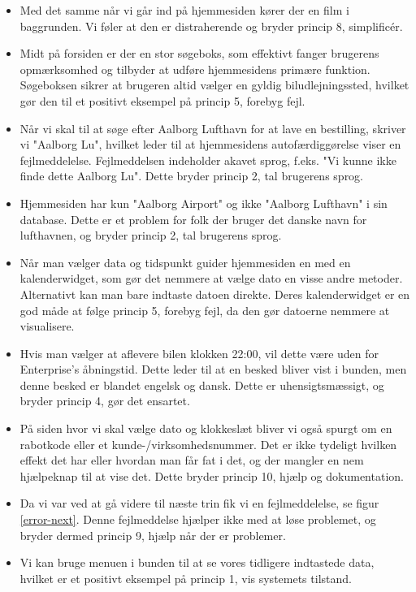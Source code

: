 \documentclass[a4paper]{article}
\begin{document}
\begin{itemize}
\item Med det samme når vi går ind på hjemmesiden kører der en film i baggrunden. Vi føler at den er distraherende og bryder princip 8, simplificér.
\item Midt på forsiden er der en stor søgeboks, som effektivt fanger brugerens opmærksomhed og tilbyder at udføre hjemmesidens primære funktion. Søgeboksen sikrer at brugeren altid vælger en gyldig biludlejningssted, hvilket gør den til et positivt eksempel på princip 5, forebyg fejl.
\item Når vi skal til at søge efter Aalborg Lufthavn for at lave en bestilling, skriver vi "Aalborg Lu", hvilket leder til at hjemmesidens autofærdiggørelse viser en fejlmeddelelse. Fejlmeddelsen indeholder akavet sprog, f.eks. "Vi kunne ikke finde dette Aalborg Lu". Dette bryder princip 2, tal brugerens sprog.
\item Hjemmesiden har kun "Aalborg Airport" og ikke "Aalborg Lufthavn" i sin database. Dette er et problem for folk der bruger det danske navn for lufthavnen, og bryder princip 2, tal brugerens sprog.
\item Når man vælger data og tidspunkt guider hjemmesiden en med en kalenderwidget, som gør det nemmere at vælge dato en visse andre metoder. Alternativt kan man bare indtaste datoen direkte. Deres kalenderwidget er en god måde at følge princip 5, forebyg fejl, da den gør datoerne nemmere at visualisere.
\item Hvis man vælger at aflevere bilen klokken 22:00, vil dette være uden for Enterprise's åbningstid. Dette leder til at en besked bliver vist i bunden, men denne besked er blandet engelsk og dansk. Dette er uhensigtsmæssigt, og bryder princip 4, gør det ensartet.
\item På siden hvor vi skal vælge dato og klokkeslæt bliver vi også spurgt om en rabotkode eller et kunde-/virksomhedsnummer. Det er ikke tydeligt hvilken effekt det har eller hvordan man får fat i det, og der mangler en nem hjælpeknap til at vise det. Dette bryder princip 10, hjælp og dokumentation.
\item Da vi var ved at gå videre til næste trin fik vi en fejlmeddelelse, se figur \ref{error-next}. Denne fejlmeddelse hjælper ikke med at  løse problemet, og bryder dermed princip 9, hjælp når der er problemer.
\item Vi kan bruge menuen i bunden til at se vores tidligere indtastede data, hvilket er et positivt eksempel på princip 1, vis systemets tilstand.

\end{itemize}
\end{document}

